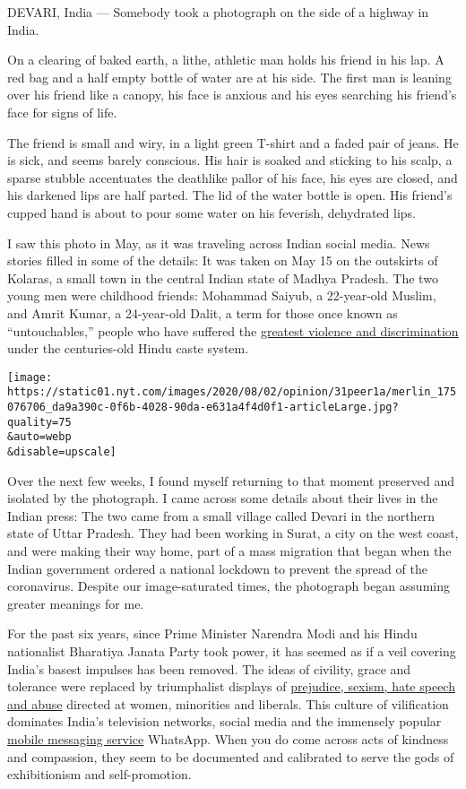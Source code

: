 DEVARI, India --- Somebody took a photograph on the side of a highway in
India.

On a clearing of baked earth, a lithe, athletic man holds his friend in
his lap. A red bag and a half empty bottle of water are at his side. The
first man is leaning over his friend like a canopy, his face is anxious
and his eyes searching his friend's face for signs of life.

The friend is small and wiry, in a light green T-shirt and a faded pair
of jeans. He is sick, and seems barely conscious. His hair is soaked and
sticking to his scalp, a sparse stubble accentuates the deathlike pallor
of his face, his eyes are closed, and his darkened lips are half parted.
The lid of the water bottle is open. His friend's cupped hand is about
to pour some water on his feverish, dehydrated lips.

I saw this photo in May, as it was traveling across Indian social media.
News stories filled in some of the details: It was taken on May 15 on
the outskirts of Kolaras, a small town in the central Indian state of
Madhya Pradesh. The two young men were childhood friends: Mohammad
Saiyub, a 22-year-old Muslim, and Amrit Kumar, a 24-year-old Dalit, a
term for those once known as ``untouchables,'' people who have suffered
the
\href{https://www.nytimes.com/2020/07/14/opinion/caste-cisco-indian-americans-discrimination.html}{greatest
violence and discrimination} under the centuries-old Hindu caste system.

\texttt{[image: https://static01.nyt.com/images/2020/08/02/opinion/31peer1a/merlin\_175076706\_da9a390c-0f6b-4028-90da-e631a4f4d0f1-articleLarge.jpg?quality=75\\\&auto=webp\\\&disable=upscale]}

Over the next few weeks, I found myself returning to that moment
preserved and isolated by the photograph. I came across some details
about their lives in the Indian press: The two came from a small village
called Devari in the northern state of Uttar Pradesh. They had been
working in Surat, a city on the west coast, and were making their way
home, part of a mass migration that began when the Indian government
ordered a national lockdown to prevent the spread of the coronavirus.
Despite our image-saturated times, the photograph began assuming greater
meanings for me.

For the past six years, since Prime Minister Narendra Modi and his Hindu
nationalist Bharatiya Janata Party took power, it has seemed as if a
veil covering India's basest impulses has been removed. The ideas of
civility, grace and tolerance were replaced by triumphalist displays of
\href{https://www.orfonline.org/research/43665-digital-hatred-real-violence-majoritarian-radicalisation-and-social-media-in-india/}{prejudice,
sexism, hate speech and abuse} directed at women, minorities and
liberals. This culture of vilification dominates India's television
networks, social media and the immensely popular
\href{https://www.wired.com/story/indias-frightening-descent-social-media-terror/}{mobile
messaging service} WhatsApp. When you do come across acts of kindness
and compassion, they seem to be documented and calibrated to serve the
gods of exhibitionism and self-promotion.

